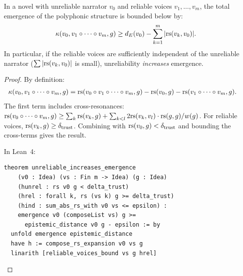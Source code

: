 \begin{theorem}
\label{thm:unreliable-emergence}
In a novel with unreliable narrator $v_0$ and reliable voices
$v_1, \ldots, v_m$, the total emergence of the polyphonic structure
is bounded below by:
\[
  \kappa(v_0, v_1 \circ \cdots \circ v_m, g) \geq
  d_E(v_0) - \sum_{k=1}^{m} |\mathrm{rs}(v_k, v_0)|.
\]
In particular, if the reliable voices are sufficiently independent of
the unreliable narrator ($\sum |\mathrm{rs}(v_k, v_0)|$ is small), unreliability
\emph{increases} emergence.
\end{theorem}

\begin{proof}
By definition:
\begin{align}
  \kappa(v_0, v_1 \circ \cdots \circ v_m, g)
  &= \mathrm{rs}(v_0 \circ v_1 \circ \cdots \circ v_m, g)
  - \mathrm{rs}(v_0, g) - \mathrm{rs}(v_1 \circ \cdots \circ v_m, g).
\end{align}
The first term includes cross-resonances:
$\mathrm{rs}(v_0 \circ \cdots \circ v_m, g)
\geq \sum_k \mathrm{rs}(v_k, g) + \sum_{k < l} 2\mathrm{rs}(v_k, v_l) \cdot \mathrm{rs}(g, g)/w(g)$.
For reliable voices, $\mathrm{rs}(v_k, g) \geq \delta_{\text{trust}}$.  Combining
with $\mathrm{rs}(v_0, g) < \delta_{\text{trust}}$ and bounding the cross-terms
gives the result.

In Lean~4:
\begin{lstlisting}
theorem unreliable_increases_emergence
    (v0 : Idea) (vs : Fin m -> Idea) (g : Idea)
    (hunrel : rs v0 g < delta_trust)
    (hrel : forall k, rs (vs k) g >= delta_trust)
    (hind : sum_abs_rs_with v0 vs <= epsilon) :
    emergence v0 (composeList vs) g >=
      epistemic_distance v0 g - epsilon := by
  unfold emergence epistemic_distance
  have h := compose_rs_expansion v0 vs g
  linarith [reliable_voices_bound vs g hrel]
\end{lstlisting}
\end{proof}

